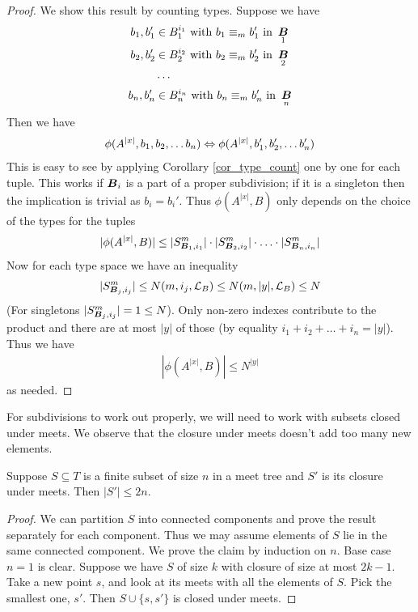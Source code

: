 \documentclass{amsart}
\DeclareMathOperator{\B}{\boldface B}
\renewcommand{\LL}{\mathcal L}
\begin{document}
\begin{proof}
	We show this result by counting types. Suppose we have
	\begin{align*}
		b_1, b_1' &\in B_1^{i_1} \text{ with } b_1 \equiv_m b_1' \text { in } \B_1 \\
		b_2, b_2' &\in B_2^{i_2} \text{ with } b_2 \equiv_m b_2' \text { in } \B_2 \\
		&\cdots \\
		b_n, b_n' &\in B_n^{i_n} \text{ with } b_n \equiv_m b_n' \text { in } \B_n
	\end{align*}
	Then we have
	\begin{align*}
		\phi(A^{|x|}, b_1, b_2, \ldots b_n) \Leftrightarrow \phi(A^{|x|}, b_1', b_2', \ldots b_n')
	\end{align*}
	This is easy to see by applying Corollary \ref{cor_type_count} one by one for each tuple. This works if $\B_i$ is a part of a proper subdivision; if it is a singleton then the implication is trivial as $b_i = b_i'$.
	Thus $\phi(A^{|x|}, B)$ only depends on the choice of the types for the tuples
	\begin{align*}
		|\phi(A^{|x|}, B)| \leq |S^m_{\B_1, i_1}| \cdot |S^m_{\B_2, i_2}| \cdot \ldots \cdot |S^m_{\B_n, i_n}|
	\end{align*}
	Now for each type space we have an inequality
	\begin{align*}
		|S^m_{\B_j, i_j}| \leq N(m, i_j, \LL_B) \leq N(m, |y|, \LL_B) \leq N
	\end{align*}
	(For singletons $|S^m_{\B_j, i_j}| = 1 \leq N$). Only non-zero indexes contribute to the product and there are at most $|y|$ of those (by equality $i_1 + i_2 + \ldots + i_n = |y|$). Thus we have
	\begin{align*}
		|\phi(A^{|x|}, B)| \leq N^{|y|}
	\end{align*}
	as needed.
\end{proof}

For subdivisions to work out properly, we will need to work with subsets closed under meets. We observe that the closure under meets doesn't add too many new elements.

\begin{Lemma} \label{lm_meet}
	Suppose $S \subseteq T$ is a finite subset of size $n$ in a meet tree and $S'$ is its closure under meets. Then $|S'| \leq 2n$.
\end{Lemma}
\begin{proof}
	We can partition $S$ into connected components and prove the result separately for each component. Thus we may assume elements of $S$ lie in the same connected component. We prove the claim by induction on $n$. Base case $n = 1$ is clear. Suppose we have $S$ of size $k$ with closure of size at most $2k - 1$. Take a new point $s$, and look at its meets with all the elements of $S$. Pick the smallest one, $s'$. Then $S \cup \{s, s'\}$ is closed under meets.
\end{proof}
\end{document}
